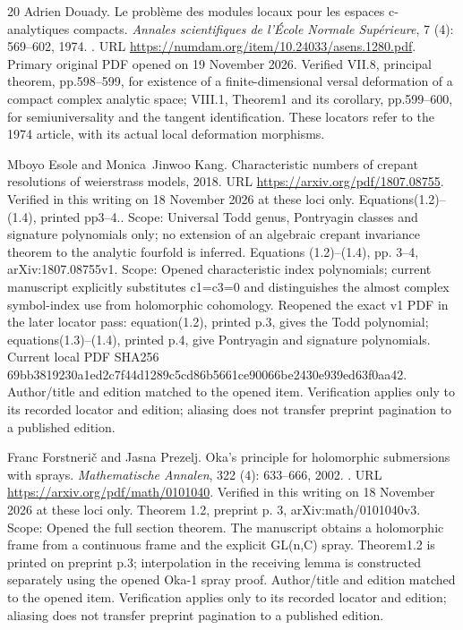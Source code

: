 \documentclass[11pt,a4paper]{article}
\theoremstyle{definition}
\begin{document}
\begin{thebibliography}{20}
Adrien Douady.
\newblock Le probl\`eme des modules locaux pour les espaces c-analytiques
  compacts.
\newblock \emph{Annales scientifiques de l'\'Ecole Normale Sup\'erieure},
  7 (4): 569--602, 1974.
\newblock {}.
\newblock URL \url{https://numdam.org/item/10.24033/asens.1280.pdf}.
\newblock Primary original PDF opened on 19 November 2026. Verified VII.8,
  principal theorem, pp.598--599, for existence of a finite-dimensional versal
  deformation of a compact complex analytic space;\allowbreak{} VIII.1, Theorem1 and its
  corollary, pp.599--600, for semiuniversality and the tangent identification.
  These locators refer to the 1974 article, with its actual local deformation
  morphisms.

Mboyo Esole and Monica~Jinwoo Kang.
\newblock Characteristic numbers of crepant resolutions of weierstrass models,
  2018.
\newblock URL \url{https://arxiv.org/pdf/1807.08755}.
\newblock Verified in this writing on 18 November 2026 at these loci only.
  Equations(1.2)–(1.4), printed pp3–4.. Scope: Universal Todd genus,
  Pontryagin classes and signature polynomials only;\allowbreak{} no extension of an
  algebraic crepant invariance theorem to the analytic fourfold is inferred.
  Equations (1.2)–(1.4), pp. 3–4, arXiv:1807.08755v1. Scope: Opened
  characteristic index polynomials;\allowbreak{} current manuscript explicitly substitutes
  c1=c3=0 and distinguishes the almost complex symbol-index use from
  holomorphic cohomology. Reopened the exact v1 PDF in the later locator pass:
  equation(1.2), printed p.3, gives the Todd polynomial;\allowbreak{}
  equations(1.3)–(1.4), printed p.4, give Pontryagin and signature
  polynomials. Current local PDF SHA256
  69bb3819230a1ed2c7f44d1289c5cd86b5661ce90066be2430e939ed63f0aa42.
  Author/title and edition matched to the opened item. Verification applies
  only to its recorded locator and edition;\allowbreak{} aliasing does not transfer preprint
  pagination to a published edition.

Franc Forstneri{\v c} and Jasna Prezelj.
\newblock Oka's principle for holomorphic submersions with sprays.
\newblock \emph{Mathematische Annalen}, 322 (4): 633--666,
  2002.
\newblock {}.
\newblock URL \url{https://arxiv.org/pdf/math/0101040}.
\newblock Verified in this writing on 18 November 2026 at these loci only.
  Theorem 1.2, preprint p. 3, arXiv:math/0101040v3. Scope: Opened the full
  section theorem. The manuscript obtains a holomorphic frame from a continuous
  frame and the explicit GL(n,C) spray. Theorem1.2 is printed on preprint p.3;\allowbreak{}
  interpolation in the receiving lemma is constructed separately using the
  opened Oka-1 spray proof. Author/title and edition matched to the opened
  item. Verification applies only to its recorded locator and edition;\allowbreak{} aliasing
  does not transfer preprint pagination to a published edition.


\end{thebibliography}
\end{document}
